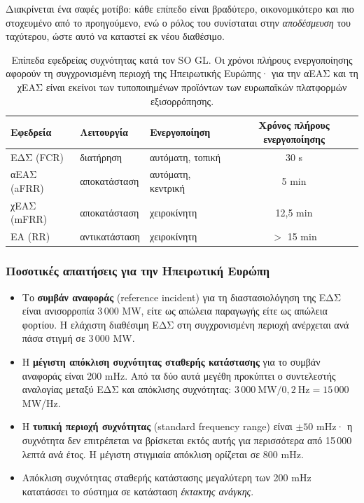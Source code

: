 Διακρίνεται ένα σαφές μοτίβο: κάθε επίπεδο είναι βραδύτερο, οικονομικότερο και πιο
στοχευμένο από το προηγούμενο, ενώ ο ρόλος του συνίσταται στην \emph{αποδέσμευση} του
ταχύτερου, ώστε αυτό να καταστεί εκ νέου διαθέσιμο.

\begin{table}[!htbp]
\centering
\begin{tabular}{lllc}
\hline
Εφεδρεία & Λειτουργία & Ενεργοποίηση & Χρόνος πλήρους ενεργοποίησης \\
\hline
ΕΔΣ (FCR)   & διατήρηση      & αυτόματη, τοπική   & 30 s \\
αΕΑΣ (aFRR) & αποκατάσταση   & αυτόματη, κεντρική & 5 min \\
χΕΑΣ (mFRR) & αποκατάσταση   & χειροκίνητη        & 12,5 min \\
ΕΑ (RR)     & αντικατάσταση  & χειροκίνητη        & $>$ 15 min \\
\hline
\end{tabular}
\caption{Επίπεδα εφεδρείας συχνότητας κατά τον SO GL. Οι χρόνοι πλήρους ενεργοποίησης
αφορούν τη συγχρονισμένη περιοχή της Ηπειρωτικής Ευρώπης· για την αΕΑΣ και τη χΕΑΣ είναι
εκείνοι των τυποποιημένων προϊόντων των ευρωπαϊκών πλατφορμών εξισορρόπησης.}
\label{tab:reserves}
\end{table}

\subsubsection*{Ποσοτικές απαιτήσεις για την Ηπειρωτική Ευρώπη}

\begin{itemize}
\item Το \textbf{συμβάν αναφοράς} (reference incident) για τη διαστασιολόγηση της ΕΔΣ είναι
      ανισορροπία 3\,000 MW, είτε ως απώλεια παραγωγής είτε ως απώλεια φορτίου. Η ελάχιστη
      διαθέσιμη ΕΔΣ στη συγχρονισμένη περιοχή ανέρχεται ανά πάσα στιγμή σε 3\,000 MW.
\item Η \textbf{μέγιστη απόκλιση συχνότητας σταθερής κατάστασης} για το συμβάν αναφοράς
      είναι 200 mHz. Από τα δύο αυτά μεγέθη προκύπτει ο συντελεστής αναλογίας μεταξύ ΕΔΣ
      και απόκλισης συχνότητας: $3\,000\ \text{MW} / 0{,}2\ \text{Hz} = 15\,000$ MW/Hz.
\item Η \textbf{τυπική περιοχή συχνότητας} (standard frequency range) είναι $\pm 50$ mHz·
      η συχνότητα δεν επιτρέπεται να βρίσκεται εκτός αυτής για περισσότερα από
      15\,000 λεπτά ανά έτος. Η μέγιστη στιγμιαία απόκλιση
      ορίζεται σε 800 mHz.
\item Απόκλιση συχνότητας σταθερής κατάστασης μεγαλύτερη των 200 mHz κατατάσσει το
      σύστημα σε κατάσταση \emph{έκτακτης ανάγκης}.
\end{itemize}

